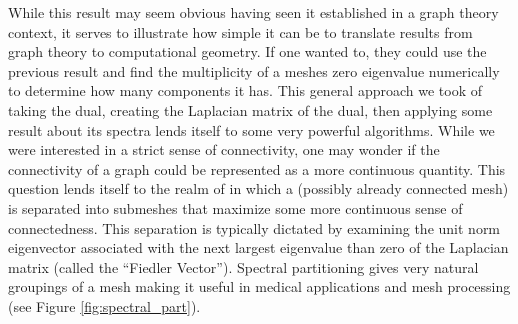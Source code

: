 \documentclass[11pt]{article}
\begin{document}
While this result may seem obvious having seen it established in a graph theory context, it serves to illustrate how simple it can be to translate results from graph theory to computational geometry. If one wanted to, they could use the previous result and find the multiplicity of a meshes zero eigenvalue numerically to determine how many components it has. This general approach we took of taking the dual, creating the Laplacian matrix of the dual, then applying some result about its spectra lends itself to some very powerful algorithms. While we were interested in a strict sense of connectivity, one may wonder if the connectivity of a graph could be represented as a more continuous quantity. This question lends itself to the realm of  in which a (possibly already connected mesh) is separated into submeshes that maximize some more continuous sense of connectedness. This separation is typically dictated by examining the unit norm eigenvector associated with the next largest eigenvalue than zero of the Laplacian matrix (called the ``Fiedler Vector''). Spectral partitioning gives very natural groupings of a mesh making it useful in medical applications \cite{10.1007/978-3-642-15705-9_41} and mesh processing \cite{bao2023spectral} (see Figure \ref{fig:spectral_part}).
\end{document}
